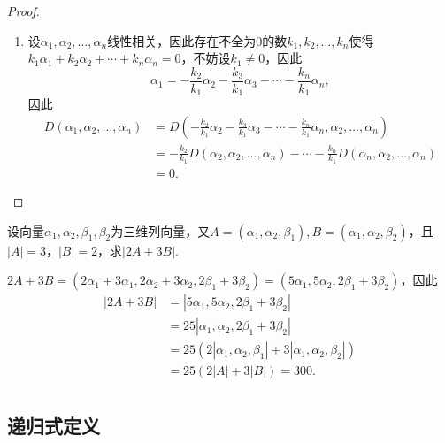 \begin{proof}
\begin{enumerate}
        \item 设$\alpha_1,\alpha_2,\ldots,\alpha_n$线性相关，因此存在不全为0的数$k_1,k_2,\ldots,k_n$使得$k_1\alpha_1+k_2\alpha_2+\cdots+k_n\alpha_n=0$，不妨设$k_1 \neq 0$，因此
        \[\alpha_1=-\frac{k_2}{k_1}\alpha_2-\frac{k_3}{k_1}\alpha_3-\cdots-\frac{k_n}{k_1}\alpha_n,\]
        因此
        \begin{align*}
            D(\alpha_1,\alpha_2,\ldots,\alpha_n) &=D(-\frac{k_2}{k_1}\alpha_2-\frac{k_3}{k_1}\alpha_3-\cdots-\frac{k_n}{k_1}\alpha_n,\alpha_2,\ldots,\alpha_n) \\
            &=-\frac{k_2}{k_1}D(\alpha_2,\alpha_2,\ldots,\alpha_n)-\cdots-\frac{k_n}{k_1}D(\alpha_n,\alpha_2,\ldots,\alpha_n) \\
            &=0.
        \end{align*}
    \end{enumerate}
\end{proof}

\begin{example} \label{ex:13:公理化定义2}
    设向量$\alpha_1,\alpha_2,\beta_1,\beta_2$为三维列向量，又$A=(\alpha_1,\alpha_2,\beta_1),B=(\alpha_1,\alpha_2,\beta_2)$，且$|A|=3$，$|B|=2$，求$|2A+3B|$.
\end{example}

\begin{solution}
    $2A+3B=(2\alpha_1+3\alpha_1,2\alpha_2+3\alpha_2,2\beta_1+3\beta_2)=(5\alpha_1,5\alpha_2,2\beta_1+3\beta_2)$，因此
    \begin{align*}
        |2A+3B| &=|5\alpha_1,5\alpha_2,2\beta_1+3\beta_2| \\
        &=25|\alpha_1,\alpha_2,2\beta_1+3\beta_2| \\
        &=25(2|\alpha_1,\alpha_2,\beta_1|+3|\alpha_1,\alpha_2,\beta_2|) \\
        &=25(2|A|+3|B|)=300. \\
    \end{align*}
\end{solution}

\subsection{递归式定义}

